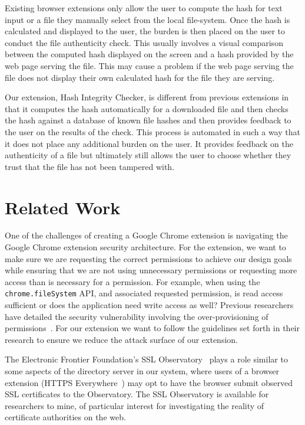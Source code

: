 \documentclass[letterpaper,twocolumn,10pt]{article}
\begin{document}
Existing browser extensions only allow the user to compute the hash for text input or a file they manually select from the local file-system. Once the hash is calculated and displayed to the user, the burden is then placed on the user to conduct the file authenticity check. This usually involves a visual comparison between the computed hash displayed on the screen and a hash provided by the web page serving the file. This may cause a problem if the web page serving the file does not display their own calculated hash for the file they are serving.

Our extension, Hash Integrity Checker, is different from previous extensions in that it computes the hash automatically for a downloaded file and then checks the hash against a database of known file hashes and then provides feedback to the user on the results of the check. This process is automated in such a way that it does not place any additional burden on the user. It provides feedback on the authenticity of a file but ultimately still allows the user to choose whether they trust that the file has not been tampered with.

\section{Related Work}

One of the challenges of creating a Google Chrome extension is navigating the Google Chrome extension security architecture. For the extension, we want to make sure we are requesting the correct permissions to achieve our design goals while ensuring that we are not using unnecessary permissions or requesting more access than is necessary for a permission. For example, when using the \texttt{chrome.fileSystem} API, and associated requested permission, is read access sufficient or does the application need write access as well? Previous researchers have detailed the security vulnerability involving the over-provisioning of permissions~\cite{180206}. For our extension we want to follow the guidelines set forth in their research to ensure we reduce the attack surface of our extension.

The Electronic Frontier Foundation's SSL Observatory~\cite{ssl-observatory} plays a role
similar to some aspects of the directory server in our system, where users of a browser
extension (HTTPS Everywhere~\cite{https-everywhere}) may opt to have the browser
submit observed SSL certificates to the Observatory. The SSL Observatory is available for
researchers to mine, of particular interest for investigating the reality of certificate authorities
on the web.
\end{document}
